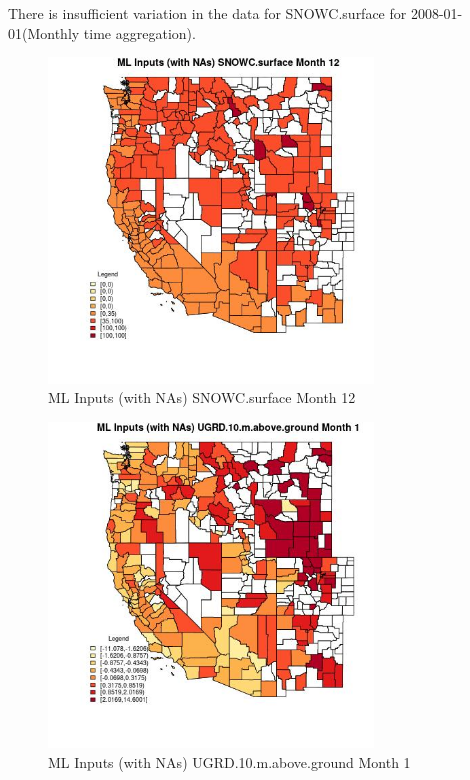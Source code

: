 There is insufficient variation in the data for SNOWC.surface for 2008-01-01(Monthly time aggregation). 
 

\begin{figure} 
\centering  
\includegraphics[width=0.77\textwidth]{Code_Outputs/Report_ML_input_PM25_Step4_part_f_de_duplicated_aveswNAs_CountySNOWCsurfacemedianMonth12.jpg} 
\caption{\label{fig:Report_ML_input_PM25_Step4_part_f_de_duplicated_aveswNAsCountySNOWCsurfacemedianMonth12}ML Inputs (with NAs) SNOWC.surface Month 12} 
\end{figure} 
 

\begin{figure} 
\centering  
\includegraphics[width=0.77\textwidth]{Code_Outputs/Report_ML_input_PM25_Step4_part_f_de_duplicated_aveswNAs_CountyUGRD10mabovegroundmedianMonth1.jpg} 
\caption{\label{fig:Report_ML_input_PM25_Step4_part_f_de_duplicated_aveswNAsCountyUGRD10mabovegroundmedianMonth1}ML Inputs (with NAs) UGRD.10.m.above.ground Month 1} 
\end{figure} 
 

